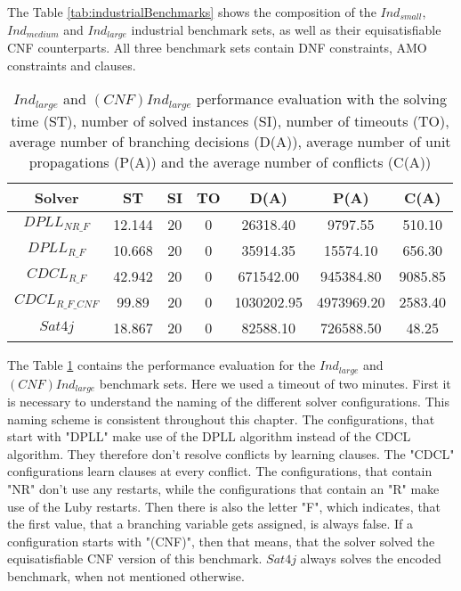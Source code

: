 The Table \ref{tab:industrialBenchmarks} shows the composition of the $Ind_{small}$, $Ind_{medium}$ and $Ind_{large}$ industrial benchmark sets, as well as their equisatisfiable CNF counterparts. All three benchmark sets contain DNF constraints, AMO constraints and clauses.


\begin{table}[!htb]
\centering
\caption[$Ind_{large}$ and $(CNF)Ind_{large}$ performance evaluation]{$Ind_{large}$ and $(CNF)Ind_{large}$ performance evaluation with the solving time (ST), number of solved instances (SI), number of timeouts (TO), average number of branching decisions (D(A)), average number of unit propagations (P(A)) and the average number of conflicts (C(A))}
\label{tab:mBenchmarks}
\begin{tabular}{|c|c|c|c|c|c|c|}
\hline
Solver & ST & SI & TO & D(A) & P(A) & C(A)\\ 
\hline
$DPLL_{NR\_F}$ & 12.144 & 20 & 0 & 26318.40 & 9797.55 & 510.10 \\ 
\hline
$DPLL_{R\_F}$ & 10.668 & 20 & 0 & 35914.35 & 15574.10 & 656.30 \\ 
\hline
$CDCL_{R\_F}$ & 42.942 & 20 & 0 & 671542.00 & 945384.80 & 9085.85 \\ 
\hline
$CDCL_{R\_F\_CNF}$ & 99.89 & 20 & 0 & 1030202.95 & 4973969.20 & 2583.40 \\ 
\hline
$Sat4j$ & 18.867 & 20 & 0 & 82588.10 & 726588.50 & 48.25 \\ 
\hline
\end{tabular}
\end{table}

The Table \ref{tab:mBenchmarks} contains the performance evaluation for the $Ind_{large}$ and $(CNF)Ind_{large}$ benchmark sets. Here we used a timeout of two minutes. First it is necessary to understand the naming of the different solver configurations. This naming scheme is consistent throughout this chapter. The configurations, that start with "DPLL" make use of the DPLL algorithm instead of the CDCL algorithm. They therefore don't resolve conflicts by learning clauses. The "CDCL" configurations learn clauses at every conflict. The configurations, that contain "NR" don't use any restarts, while the configurations that contain an "R" make use of the Luby restarts. Then there is also the letter "F", which indicates, that the first value, that a branching variable gets assigned, is always false. If a configuration starts with "(CNF)", then that means, that the solver solved the equisatisfiable CNF version of this benchmark. $Sat4j$ always solves the encoded benchmark, when not mentioned otherwise.

